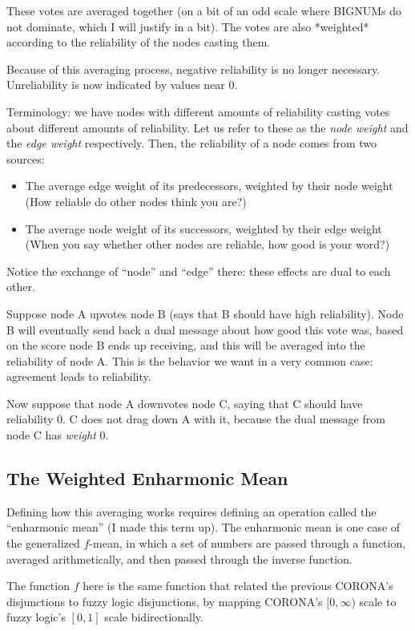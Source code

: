 \documentclass{article}
\begin{document}
These votes are averaged together (on a bit of an odd scale where BIGNUMs do
not dominate, which I will justify in a bit). The votes are also *weighted*
according to the reliability of the nodes casting them.

Because of this averaging process, negative reliability is no longer necessary.
Unreliability is now indicated by values near 0.

Terminology: we have nodes with different amounts of reliability casting votes
about different amounts of reliability. Let us refer to these as the \emph{node
weight} and the \emph{edge weight} respectively. Then, the reliability of a
node comes from two sources:

\begin{itemize}
\item The average edge weight of its predecessors, weighted by their node weight
  (How reliable do other nodes think you are?)
\item The average node weight of its successors, weighted by their edge weight
  (When you say whether other nodes are reliable, how good is your word?)
\end{itemize}

Notice the exchange of ``node'' and ``edge'' there: these effects are dual to
each other. 

Suppose node A upvotes node B (says that B should have high reliability). Node
B will eventually send back a dual message about how good this vote was, based
on the score node B ends up receiving, and this will be averaged into the
reliability of node A. This is the behavior we want in a very common case:
agreement leads to reliability.

Now suppose that node A downvotes node C, saying that C should have reliability
0. C does not drag down A with it, because the dual message from node C has
\emph{weight} 0.

\subsection{The Weighted Enharmonic Mean}

Defining how this averaging works requires defining an operation called the
``enharmonic mean'' (I made this term up). The enharmonic mean is one case of
the generalized $f$-mean, in which a set of numbers are passed through a
function, averaged arithmetically, and then passed through the inverse
function.

The function $f$ here is the same function that related the previous CORONA's
disjunctions to fuzzy logic disjunctions, by mapping CORONA's $[0, \infty)$
scale to fuzzy logic's $[0, 1]$ scale bidirectionally.
\end{document}
